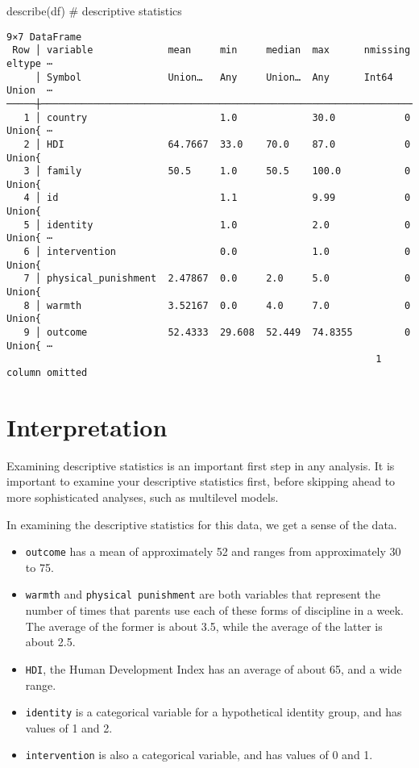\documentclass[
  letterpaper,
  DIV=11,
  numbers=noendperiod]{scrreprt}
\newenvironment{Shaded}{\begin{snugshade}}{\end{snugshade}}
\newcommand{\CommentTok}[1]{\textcolor[rgb]{0.37,0.37,0.37}{#1}}
\newcommand{\FunctionTok}[1]{\textcolor[rgb]{0.28,0.35,0.67}{#1}}
\newcommand{\NormalTok}[1]{\textcolor[rgb]{0.00,0.23,0.31}{#1}}
\providecommand{\tightlist}{%
  \setlength{\itemsep}{0pt}\setlength{\parskip}{0pt}}\usepackage{longtable,booktabs,array}
\begin{document}
\begin{Shaded}
\begin{Highlighting}[]

\FunctionTok{describe}\NormalTok{(df) }\CommentTok{\# descriptive statistics}
\end{Highlighting}
\end{Shaded}

\begin{verbatim}
9×7 DataFrame
 Row │ variable             mean     min     median  max      nmissing  eltype ⋯
     │ Symbol               Union…   Any     Union…  Any      Int64     Union  ⋯
─────┼──────────────────────────────────────────────────────────────────────────
   1 │ country                       1.0             30.0            0  Union{ ⋯
   2 │ HDI                  64.7667  33.0    70.0    87.0            0  Union{
   3 │ family               50.5     1.0     50.5    100.0           0  Union{
   4 │ id                            1.1             9.99            0  Union{
   5 │ identity                      1.0             2.0             0  Union{ ⋯
   6 │ intervention                  0.0             1.0             0  Union{
   7 │ physical_punishment  2.47867  0.0     2.0     5.0             0  Union{
   8 │ warmth               3.52167  0.0     4.0     7.0             0  Union{
   9 │ outcome              52.4333  29.608  52.449  74.8355         0  Union{ ⋯
                                                                1 column omitted
\end{verbatim}

\section{Interpretation}\label{interpretation}

Examining descriptive statistics is an important first step in any
analysis. It is important to examine your descriptive statistics first,
before skipping ahead to more sophisticated analyses, such as multilevel
models.

In examining the descriptive statistics for this data, we get a sense of
the data.

\begin{itemize}
\tightlist
\item
  \texttt{outcome} has a mean of approximately 52 and ranges from
  approximately 30 to 75.
\item
  \texttt{warmth} and \texttt{physical\ punishment} are both variables
  that represent the number of times that parents use each of these
  forms of discipline in a week. The average of the former is about 3.5,
  while the average of the latter is about 2.5.
\item
  \texttt{HDI}, the Human Development Index has an average of about 65,
  and a wide range.
\item
  \texttt{identity} is a categorical variable for a hypothetical
  identity group, and has values of 1 and 2.
\item
  \texttt{intervention} is also a categorical variable, and has values
  of 0 and 1.
\end{itemize}
\end{document}
